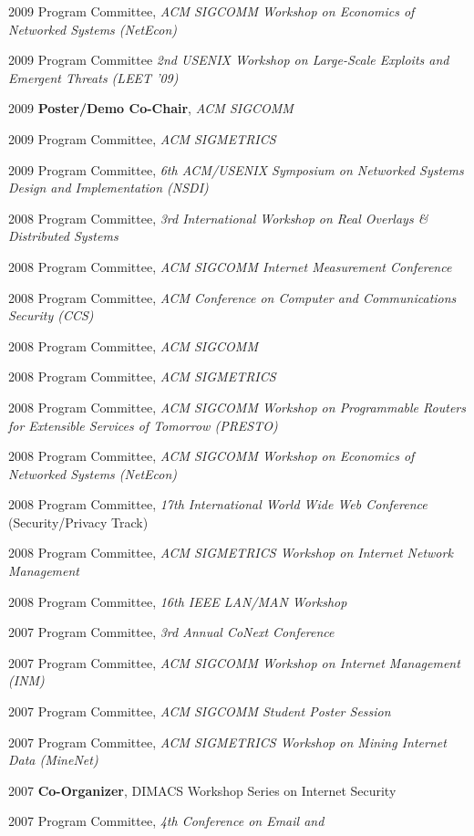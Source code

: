 \begin{cvlist}{}
\item[2009] Program Committee, {\em ACM SIGCOMM Workshop on Economics of
Networked Systems (NetEcon)}\nw
\item[2009] Program Committee {\em 2nd USENIX Workshop on Large-Scale
  Exploits and Emergent Threats (LEET '09)}\nw
\item[2009] {\bf Poster/Demo Co-Chair}, {\em ACM SIGCOMM}\nw
\item[2009] Program Committee, {\em ACM SIGMETRICS}\nw
\item[2009] Program Committee, {\em 6th ACM/USENIX Symposium on
  Networked Systems Design and Implementation (NSDI)}\nw
\item[2008] Program Committee, {\em 3rd International Workshop on
  Real Overlays \& Distributed Systems}\nw
\item[2008] Program Committee, {\em ACM SIGCOMM Internet Measurement
  Conference} \nw
\item[2008] Program Committee, {\em ACM Conference on Computer and
  Communications Security (CCS)}\nw
\item[2008] Program Committee, {\em ACM SIGCOMM}\nw
\item[2008] Program Committee, {\em ACM SIGMETRICS}
\item[2008] Program Committee, {\em ACM SIGCOMM Workshop on Programmable
  Routers for Extensible Services of Tomorrow (PRESTO)}
\item[2008] Program Committee, {\em ACM SIGCOMM Workshop on Economics of
Networked Systems (NetEcon)}
\item[2008] Program Committee, {\em 17th International World Wide Web
  Conference} (Security/Privacy Track)
\item[2008] Program Committee, {\em ACM SIGMETRICS Workshop on Internet
  Network Management}
\item[2008] Program Committee, {\em 16th IEEE LAN/MAN Workshop}
\item[2007] Program Committee, {\em 3rd Annual CoNext Conference}
\item[2007] Program Committee, {\em ACM SIGCOMM Workshop on Internet
  Management (INM)} 
\item[2007] Program Committee, {\em ACM SIGCOMM Student Poster Session}
\item[2007] Program Committee, {\em ACM SIGMETRICS Workshop on Mining
  Internet Data (MineNet)} 
\item[2007] {\bf Co-Organizer}, DIMACS Workshop Series on Internet Security
\item[2007] Program Committee, {\em 4th Conference on Email and
}
\end{cvlist}
